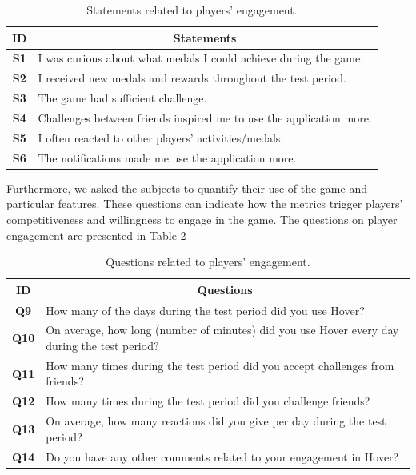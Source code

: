 \begin{table}[H]
    \centering
    \begin{tabularx}{0.95\textwidth}{|c|X|}
        \hline
        \textbf{ID} & \multicolumn{1}{c|}{\textbf{Statements}} \\ \hline
        \textbf{S1} & I was curious about what medals I could achieve during the game. \\
        \textbf{S2} & I received new medals and rewards throughout the test period. \\
        \textbf{S3} & The game had sufficient challenge. \\
        \textbf{S4} & Challenges between friends inspired me to use the application more. \\
        \textbf{S5} & I often reacted to other players' activities/medals. \\
        \textbf{S6} & The notifications made me use the application more. \\ \hline
    \end{tabularx}
    \caption{Statements related to players' engagement.}
    \label{tab:player_engagement_statements}
\end{table}

Furthermore, we asked the subjects to quantify their use of the game and particular features. These questions can indicate how the metrics trigger players’ competitiveness and willingness to engage in the game. The questions on player engagement are presented in Table \ref{tab:player_engagement_questions}

\begin{table}[H]
    \centering
    \begin{tabularx}{0.95\textwidth}{|c|X|}
        \hline
        \textbf{ID} & \multicolumn{1}{c|}{\textbf{Questions}} \\ \hline
        \textbf{Q9} & How many of the days during the test period did you use Hover? \\
        \textbf{Q10} & On average, how long (number of minutes) did you use Hover every day during the test period? \\
        \textbf{Q11} & How many times during the test period did you accept challenges from friends? \\
        \textbf{Q12} & How many times during the test period did you challenge friends? \\
        \textbf{Q13} & On average, how many reactions did you give per day during the test period? \\
        \textbf{Q14} & Do you have any other comments related to your engagement in Hover? \\ \hline
    \end{tabularx}
    \caption{Questions related to players' engagement.}
    \label{tab:player_engagement_questions}
\end{table}

